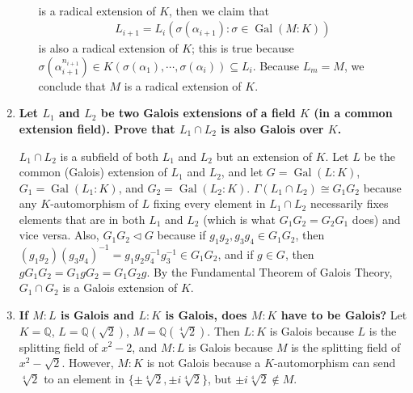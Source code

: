 \documentclass[12pt]{article}
\DeclareMathOperator{\Gal}{Gal}
\begin{document}
\begin{enumerate}
\begin{enumerate}
\begin{align*}
                \end{align*}
                is a radical extension of $K$, then we claim that
                \begin{align*}
                    L_{i + 1} = L_i(\sigma(\alpha_{i + 1}) : \sigma \in \Gal(M : K))
                \end{align*}
                is also a radical extension of $K$; this is true because $\sigma(\alpha_{i + 1}^{n_{i + 1}}) \in K(\sigma(\alpha_1), \cdots, \sigma(\alpha_i)) \subseteq L_i$. Because $L_m = M$, we conclude that $M$ is a radical extension of $K$.
        \end{enumerate}

    \item
        \boldmath\textbf{Let $L_1$ and $L_2$ be two Galois extensions of a field $K$ (in a common extension field).  Prove that $L_1 \cap L_2$ is also Galois over $K$.
        }\unboldmath \par
        $L_1 \cap L_2$ is a subfield of both $L_1$ and $L_2$ but an extension of $K$. Let $L$ be the common (Galois) extension of $L_1$ and $L_2$, and let $G = \Gal(L : K)$, $G_1 = \Gal(L_1 : K)$, and $G_2 = \Gal(L_2 : K)$. $\Gamma(L_1 \cap L_2) \cong G_1 G_2$ because any $K$-automorphism of $L$ fixing every element in $L_1 \cap L_2$ necessarily fixes elements that are in both $L_1$ and $L_2$ (which is what $G_1 G_2 = G_2 G_1$ does) and vice versa. Also, $G_1 G_2 \triangleleft G$ because if $g_1 g_2, g_3 g_4 \in G_1 G_2$, then $(g_1 g_2)(g_3 g_4)^{-1} = g_1 g_2 g_4^{-1} g_3^{-1} \in G_1 G_2$, and if $g \in G$, then $g G_1 G_2 = G_1 g G_2 = G_1 G_2 g$. By the Fundamental Theorem of Galois Theory, $G_1 \cap G_2$ is a Galois extension of $K$.

    \item
        \boldmath\textbf{If $M:L$ is Galois and $L:K$ is Galois, does $M:K$ have to be Galois?
        }\unboldmath
        Let $K = \mathbb{Q}$, $L = \mathbb{Q}(\sqrt{2})$, $M = \mathbb{Q}(\sqrt[4]{2})$. Then $L : K$ is Galois because $L$ is the splitting field of $x^2 - 2$, and $M : L$ is Galois because $M$ is the splitting field of $x^2 - \sqrt{2}$. However, $M : K$ is not Galois because a $K$-automorphism can send $\sqrt[4]{2}$ to an element in $\{ \pm \sqrt[4]{2}, \pm i \sqrt[4]{2} \}$, but $\pm i \sqrt[4]{2} \notin M$.


\end{enumerate}
\end{document}
